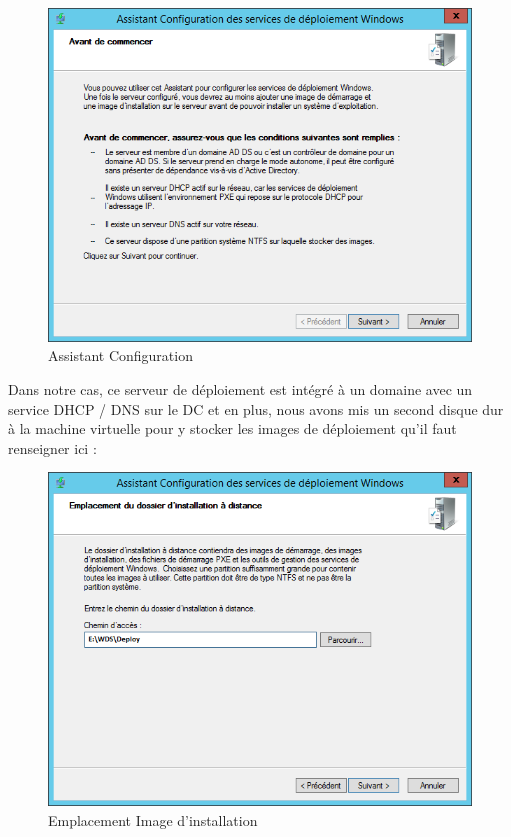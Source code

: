 \documentclass[11pt,a4paper,oneside]{article}
\begin{document}
\begin{figure}[hbtp]
\centering
\includegraphics[scale=0.82]{Pictures/Configuration/Conf2.png}
\caption{\label{etiquette} Assistant Configuration}
\end{figure}
\newpage

Dans notre cas, ce serveur de déploiement est intégré à un domaine avec un service DHCP / DNS sur le DC et en plus, nous avons mis un second disque dur à la machine virtuelle pour y stocker les images de déploiement qu'il faut renseigner ici : \textbf{} \\

\begin{figure}[hbtp]
\centering
\includegraphics[scale=0.8]{Pictures/Configuration/Conf4.png}
\caption{\label{etiquette} Emplacement Image d'installation}
\end{figure}
\end{document}
